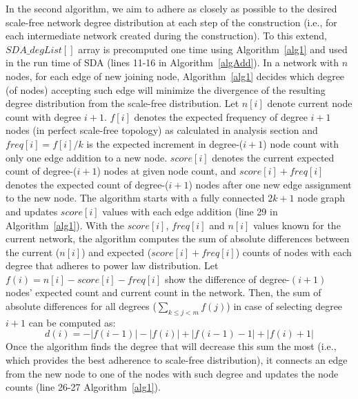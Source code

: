 \documentclass[10pt,journal,cspaper,compsoc]{IEEEtran}
\begin{document}
In the second algorithm, we aim to adhere as closely as possible to the desired scale-free network degree distribution at each step of the construction (i.e., for each intermediate network created during the construction). To this extend, $SDA\_degList[]$ array is precomputed one time using Algorithm~\ref{alg1} and used in the run time of SDA (lines 11-16 in Algorithm~\ref{algAdd}). In a network with $n$ nodes, for each edge of new joining node, Algorithm~\ref{alg1} decides which degree (of nodes) accepting such edge will minimize the divergence of the resulting degree distribution from the scale-free distribution. Let $n[i]$ denote current node count with degree $i+1$. $f[i]$ denotes the expected frequency of degree $i+1$ nodes (in perfect scale-free topology) as calculated in analysis section and $freq[i] = f[i]/k$ is the expected increment in degree-($i+1$) node count with only one edge addition to a new node. $score[i]$ denotes the current expected count of degree-($i+1$) nodes at given node count, and $score[i]+freq[i]$ denotes the expected count of degree-($i+1$) nodes after one new edge assignment to the new node. The algorithm starts with a fully connected $2k+1$ node graph and updates $score[i]$ values with each edge addition (line 29 in Algorithm~\ref{alg1}). With the $score[i]$, $freq[i]$ and $n[i]$ values known for the current network, the algorithm computes the sum of absolute differences between the current ($n[i]$) and expected ($score[i]+freq[i]$) counts of nodes with each degree that adheres to power law distribution. Let $f(i)=n[i]-score[i]-freq[i]$ show the difference of degree-$(i+1)$ nodes' expected count and current count in the network. Then, the sum of absolute differences for all degrees ($\sum_{k \leq j < m}{f(j)}$) in case of selecting degree $i+1$ can be computed as:
\[
d(i)=-|f(i-1)|-|f(i)|+ |f(i-1)-1|+ |f(i)+1|
\]  
Once the algorithm finds the degree that will decrease this sum the most (i.e., which provides the best adherence to scale-free distribution), it connects an edge from the new node to one of the nodes with such degree and updates the node counts (line 26-27 Algorithm~\ref{alg1}).
\end{document}
